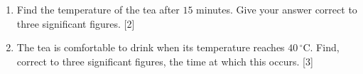 \documentclass[12pt, twoside]{article}
\begin{document}
\begin{enumerate}[itemsep=0.4cm]
\begin{enumerate}[itemsep=0.4cm]
  \vspace{2.5cm}

  \item Find the temperature of the tea after $15$ minutes. Give your
  answer correct to three significant figures. \hfill [2]

  \vspace{4.5cm}

  \item The tea is comfortable to drink when its temperature reaches
  $40\,^{\circ}\text{C}$. Find, correct to three significant figures,
  the time at which this occurs. \hfill [3]

  \vspace{5cm}
\end{enumerate}

\end{enumerate}
\end{document}
